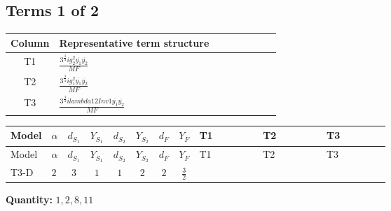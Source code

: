 \documentclass[8pt]{article}
\begin{document}
\begin{landscape}
\subsection*{Terms 1 of 2}
\begin{center}
\begin{tabular}{@{}c >{\raggedright\arraybackslash}p{0.82\linewidth}@{}}
\toprule
Column & Representative term structure \\
\midrule
T1 & \(\displaystyle \frac{3^{\frac{3}{4}} i g_{2}^{2} \overline{y_{1}} \overline{y_{2}}}{MF}\) \\
\midrule
T2 & \(\displaystyle \frac{3^{\frac{3}{4}} i g_{1}^{2} \overline{y_{1}} \overline{y_{2}}}{MF}\) \\
\midrule
T3 & \(\displaystyle \frac{3^{\frac{3}{4}} i lambda12Inv1 \overline{y_{1}} \overline{y_{2}}}{MF}\) \\
\midrule
\bottomrule
\end{tabular}
\end{center}
\smallskip
\tiny
\begin{longtable}{@{}llcccccc >{\raggedright\arraybackslash}p{0.21\linewidth} >{\raggedright\arraybackslash}p{0.21\linewidth} >{\raggedright\arraybackslash}p{0.21\linewidth}@{}}
\toprule
Model & $\alpha$ & $d_{S_1}$ & $Y_{S_1}$ & $d_{S_2}$ & $Y_{S_2}$ & $d_F$ & $Y_F$ & T1 & T2 & T3 \\
\midrule
\endfirsthead
\toprule
Model & $\alpha$ & $d_{S_1}$ & $Y_{S_1}$ & $d_{S_2}$ & $Y_{S_2}$ & $d_F$ & $Y_F$ & T1 & T2 & T3 \\
\midrule
\endhead
T3-D & $2$ & $3$ & $1$ & $1$ & $2$ & $2$ & $\frac{3}{2}$ & \scriptsize\adjustbox{max width=\linewidth}{$\begin{gathered} - \frac{25 \cdot 3^{\frac{3}{4}} i g_{2}^{2} \overline{y_{1}} \overline{y_{2}}}{24 MF}\end{gathered}$} & \scriptsize\adjustbox{max width=\linewidth}{$\begin{gathered} - \frac{9 \cdot 3^{\frac{3}{4}} i g_{1}^{2} \overline{y_{1}} \overline{y_{2}}}{8 MF}\end{gathered}$} & \scriptsize\adjustbox{max width=\linewidth}{$\begin{gathered} - \frac{3^{\frac{3}{4}} i lambda12Inv1 \overline{y_{1}} \overline{y_{2}}}{6 MF}\end{gathered}$} \\
\midrule
\bottomrule
\end{longtable}
\clearpage
\noindent\textbf{Quantity: }$\mathrm{1,2,8,11}$\par\smallskip

\end{landscape}
\end{document}

